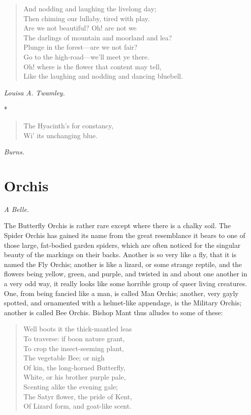 \documentclass[11pt,twoside]{article}
\newcommand\flower[2]{\section*{#1}\addcontentsline{toc}{section}{#1}%
  \noindent\textit{#2.}\par\medskip}
\newcommand\stars{\begin{center}*\quad*\quad*\end{center}}
\newcommand\by[1]{\par\hfill\textit{#1}\par}
\begin{document}
\begin{verse}
\quad And nodding and laughing the livelong day;\\
\quad Then chiming our lullaby, tired with play.\\
\quad Are we not beautiful? Oh! are not we\\
\quad The darlings of mountain and moorland and lea?\\
\quad Plunge in the forest---are we not fair?\\
\quad Go to the high-road---we’ll meet ye there.\\
\quad Oh! where is the flower that content may tell,\\
Like the laughing and nodding and dancing bluebell.
\end{verse}

\by{Louisa A. Twamley.}

\stars

\begin{verse}
The Hyacinth’s for constancy,\\
Wi’ its unchanging blue.
\end{verse}

\by{Burns.}

\flower{Orchis}{A Belle}

The Butterfly Orchis is rather rare except where there is a chalky soil. The Spider Orchis has gained its name from the great resemblance it bears to one of those large, fat-bodied garden spiders, which are often noticed for the singular beauty of the markings on their backs. Another is so very like a fly, that it is named the Fly Orchis; another is like a lizard, or some strange reptile, and the flowers being yellow, green, and purple, and twisted in and about one another in a very odd way, it really looks like some horrible group of queer living creatures. One, from being fancied like a man, is called Man Orchis; another, very gayly spotted, and ornamented with a helmet-like appendage, is the Military Orchis; another is called Bee Orchis. Bishop Mant thus alludes to some of these:

\begin{verse}
Well boots it the thick-mantled leas\\
To traverse: if boon nature grant,\\
To crop the insect-seeming plant,\\
The vegetable Bee; or nigh\\
Of kin, the long-horned Butterfly,\\
White, or his brother purple pale,\\
Scenting alike the evening gale;\\
The Satyr flower, the pride of Kent,\\
Of Lizard form, and goat-like scent.
\end{verse}
\end{document}
